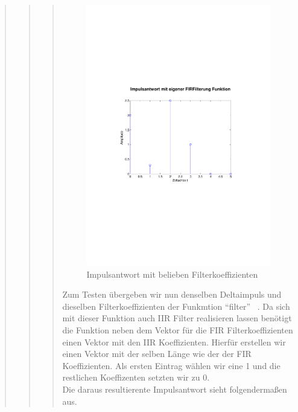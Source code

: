 \begin{quote}
\begin{quote}
\begin{quote}
			\begin{figure}[H]
		            \centering
		                \includegraphics[scale=0.5, trim = 1cm 6cm 1.5cm 8cm,
		                clip]{./Bilder/Impulsantwort_aufgabe1}
		                    \caption{Impulsantwort mit belieben Filterkoeffizienten}
		                    \label{fig:./Bilder/Impulsantwort_aufgabe1}
		            \end{figure}
		            
			Zum Testen übergeben wir nun denselben Deltaimpuls und dieselben Filterkoeffizienten der Funkmtion ``filter'' \ . Da
			sich mit dieser Funktion auch IIR Filter realisieren lassen benötigt die Funktion neben dem Vektor für
			die FIR Filterkoeffizienten einen Vektor mit den IIR Koeffizienten. Hierfür erstellen wir einen Vektor mit der selben
			Länge wie der der FIR Koeffizienten. Als ersten Eintrag wählen wir eine 1 und die restlichen Koeffizenten setzten wir
			zu 0.\\
			Die daraus resultierente Impulsantwort sieht folgendermaßen aus.
			

\end{quote}
\end{quote}
\end{quote}
